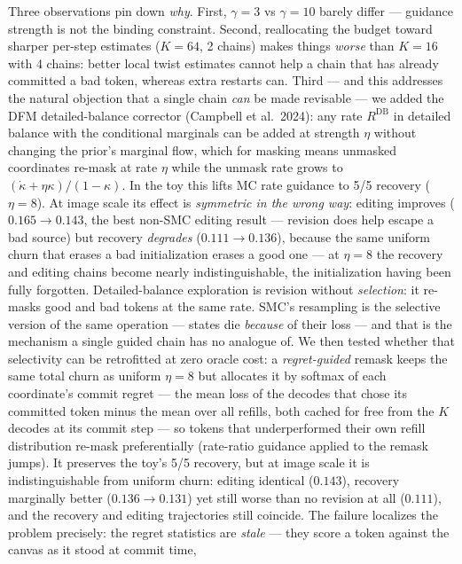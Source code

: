 \documentclass[11pt]{article}
\begin{document}
Three observations pin down \emph{why}. First, $\gamma{=}3$ vs
$\gamma{=}10$ barely differ --- guidance strength is not the binding
constraint. Second, reallocating the budget toward sharper per-step
estimates ($K{=}64$, 2 chains) makes things \emph{worse} than $K{=}16$
with 4 chains: better local twist estimates cannot help a chain that has
already committed a bad token, whereas extra restarts can. Third --- and
this addresses the natural objection that a single chain \emph{can} be
made revisable --- we added the DFM detailed-balance corrector (Campbell
et al.\ 2024): any rate $R^{\mathrm{DB}}$ in detailed balance with the
conditional marginals can be added at strength $\eta$ without changing
the prior's marginal flow, which for masking means unmasked coordinates
re-mask at rate $\eta$ while the unmask rate grows to
$(\dot\kappa + \eta\kappa)/(1-\kappa)$. In the toy this lifts MC rate
guidance to 5/5 recovery ($\eta{=}8$). At image scale its effect is
\emph{symmetric in the wrong way}: editing improves ($0.165 \to 0.143$,
the best non-SMC editing result --- revision does help escape a bad
source) but recovery \emph{degrades} ($0.111 \to 0.136$), because the
same uniform churn that erases a bad initialization erases a good one ---
at $\eta{=}8$ the recovery and editing chains become nearly
indistinguishable, the initialization having been fully forgotten.
Detailed-balance exploration is revision without \emph{selection}: it
re-masks good and bad tokens at the same rate. SMC's resampling is the
selective version of the same operation --- states die \emph{because} of
their loss --- and that is the mechanism a single guided chain has no
analogue of. We then tested whether that selectivity can be retrofitted
at zero oracle cost: a \emph{regret-guided} remask keeps the same total
churn as uniform $\eta{=}8$ but allocates it by softmax of each
coordinate's commit regret --- the mean loss of the decodes that chose
its committed token minus the mean over all refills, both cached for
free from the $K$ decodes at its commit step --- so tokens that
underperformed their own refill distribution re-mask preferentially
(rate-ratio guidance applied to the remask jumps). It preserves the
toy's 5/5 recovery, but at image scale it is indistinguishable from
uniform churn: editing identical ($0.143$), recovery marginally better
($0.136 \to 0.131$) yet still worse than no revision at all ($0.111$),
and the recovery and editing trajectories still coincide. The failure
localizes the problem precisely: the regret statistics are \emph{stale}
--- they score a token against the canvas as it stood at commit time,
\end{document}
